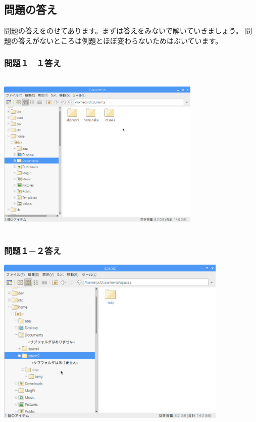 \documentclass[a4paper,12pt]{jarticle}
\begin{document}
\bigskip

\flushleft
\clearpage\subsection{\bfseries
問題の答え}

問題の答えをのせてあります。まずは答えをみないで解いていきましょう。\newline
問題の答えがないところは例題とほぼ変わらないためはぶいています。

\subsubsection{\bfseries
問題１−１答え}

\bigskip


\centering
\includegraphics[width=9.763cm,height=8.038cm]{textbook-img212.png}
\flushleft

\bigskip


\bigskip


\bigskip

\subsubsection{\bfseries
問題１−２答え}

\bigskip



\centering
\includegraphics[width=11.081cm,height=8.008cm]{textbook-img213.png}
\flushleft
\end{document}

